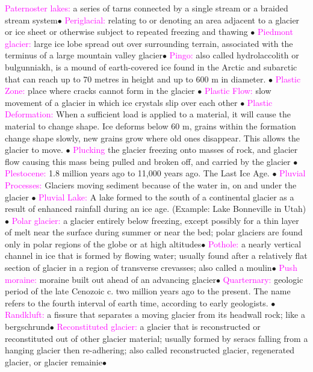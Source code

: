 \documentclass{article}
\newcommand{\ddd}{$\bullet$}
\newcommand{\pink}[1]{\textcolor{magenta}{#1}}
\newcommand{\vocab}[1]{{\pink{#1}}}
\begin{document}
\begin{multicols*}{4}
		\vocab{        Paternoster lakes: } a series of tarns connected by a single stream or a braided stream system\ddd
		\vocab{        Periglacial: } relating to or denoting an area adjacent to a glacier or ice sheet or otherwise subject to repeated freezing and thawing \ddd        
		\vocab{        Piedmont glacier: } large ice lobe spread out over surrounding terrain, associated with the terminus of a large mountain valley glacier\ddd
		\vocab{        Pingo: } also called hydrolaccolith or bulgunniakh, is a mound of earth-covered ice found in the Arctic and subarctic that can reach up to 70 metres in height and up to 600 m in diameter. \ddd       
		\vocab{Plastic Zone: } place where cracks cannot form in the glacier \ddd
		\vocab{Plastic Flow: } slow movement of a glacier in which ice crystals slip over each other \ddd
		\vocab{Plastic Deformation: } When a sufficient load is applied to a material, it will cause the material to change shape. Ice deforms below 60 m, grains within the formation change shape slowly, new grains grow where old ones disappear. This allows the glacier to move. \ddd
		\vocab{Plucking} the glacier freezing onto masses of rock, and glacier flow causing this mass being pulled and broken off, and carried by the glacier \ddd
		\vocab{Plestocene: } 1.8 million years ago to 11,000 years ago. The Last Ice Age.  \ddd
		\vocab{Pluvial Processes: } Glaciers moving sediment because of the water in, on and under the glacier \ddd
		\vocab{Pluvial Lake: } A lake formed to the south of a continental glacier as a result of enhanced rainfall during an ice age. (Example: Lake Bonneville in Utah) \ddd
		\vocab{        Polar glacier: } a glacier entirely below freezing, except possibly for a thin layer of melt near the surface during summer or near the bed; polar glaciers are found only in polar regions of the globe or at high altitudes\ddd
		\vocab{        Pothole: } a nearly vertical channel in ice that is formed by flowing water; usually found after a relatively flat section of glacier in a region of transverse crevasses; also called a moulin\ddd
		\vocab{        Push moraine: } moraine built out ahead of an advancing glacier\ddd
		\vocab{Quarternary: } geologic period of the late Cenozoic c. two million years ago to the present. The name refers to the fourth interval of earth time, according to early geologists.  \ddd
		\vocab{        Randkluft: } a fissure that separates a moving glacier from its headwall rock; like a bergschrund\ddd
		\vocab{        Reconstituted glacier: } a glacier that is reconstructed or reconstituted out of other glacier material; usually formed by seracs falling from a hanging glacier then re-adhering; also called reconstructed glacier, regenerated glacier, or glacier remainie\ddd

\end{multicols*}
\end{document}
